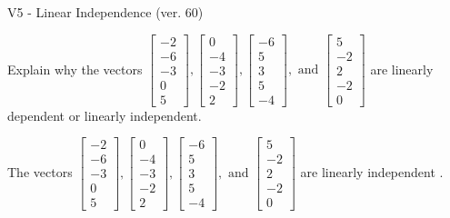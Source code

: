 \begin{exercise}
  \begin{exerciseTitle}V5 - Linear Independence (ver. 60)\end{exerciseTitle}
  \begin{exerciseStatement}
    Explain why the vectors \(\left[\begin{array}{r}
-2 \\
-6 \\
-3 \\
0 \\
5
\end{array}\right] , \left[\begin{array}{r}
0 \\
-4 \\
-3 \\
-2 \\
2
\end{array}\right] , \left[\begin{array}{r}
-6 \\
5 \\
3 \\
5 \\
-4
\end{array}\right] , \text{ and } \left[\begin{array}{r}
5 \\
-2 \\
2 \\
-2 \\
0
\end{array}\right]\) are linearly dependent or linearly independent.	


  \end{exerciseStatement}
  \begin{exerciseAnswer}
   The vectors \(\left[\begin{array}{r}
-2 \\
-6 \\
-3 \\
0 \\
5
\end{array}\right] , \left[\begin{array}{r}
0 \\
-4 \\
-3 \\
-2 \\
2
\end{array}\right] , \left[\begin{array}{r}
-6 \\
5 \\
3 \\
5 \\
-4
\end{array}\right] , \text{ and } \left[\begin{array}{r}
5 \\
-2 \\
2 \\
-2 \\
0
\end{array}\right]\) are 
  	 linearly independent  .
  


  \end{exerciseAnswer}
\end{exercise}